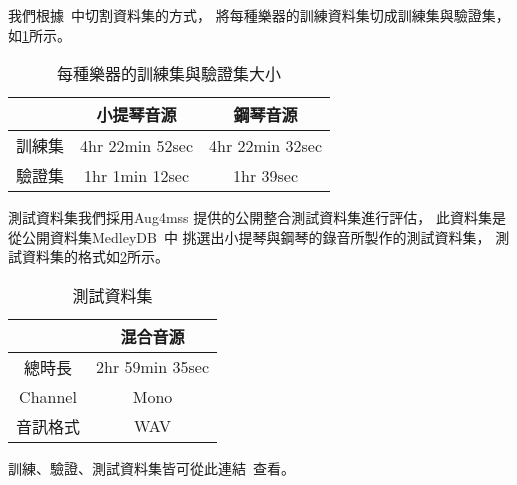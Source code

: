\documentclass[class=NCU_thesis, crop=false]{standalone}
\begin{document}
我們根據~\cite{Chiu_ChingYu2020MixingSpecific}中切割資料集的方式，
將每種樂器的訓練資料集切成訓練集與驗證集，如\cref{table:table-ours-splited-dataset}所示。
\begin{table}[h]
    \centering
    \caption{每種樂器的訓練集與驗證集大小}
    \label{table:table-ours-splited-dataset}
    \begin{tabular}{|c|c|c|}
        \hline
        \multicolumn{1}{|c|}{} & \multicolumn{1}{|c|}{小提琴音源} & \multicolumn{1}{|c|}{鋼琴音源} \\
        \hline
        訓練集 & 4hr 22min 52sec & 4hr 22min 32sec \\
        \hline
        驗證集 & 1hr 1min 12sec & 1hr 39sec \\
        \hline
    \end{tabular}
\end{table}

測試資料集我們採用Aug4mss
提供的公開整合測試資料集進行評估，
此資料集是從公開資料集MedleyDB~\cite{Bittner2014MedleyDB}中
挑選出小提琴與鋼琴的錄音所製作的測試資料集，
測試資料集的格式如\cref{table:table-test-dataset}所示。
\begin{table}[H]
    \centering
    \caption{測試資料集}
    \label{table:table-test-dataset}
    \begin{tabular}{|c|c|}
        \hline
        \multicolumn{1}{|c|}{} & \multicolumn{1}{|c|}{混合音源} \\
        \hline
        總時長 & 2hr 59min 35sec \\
        \hline
        Channel & Mono \\
        \hline
        音訊格式 & WAV \\
        \hline
    \end{tabular}
\end{table}

訓練、驗證、測試資料集皆可從此連結~\cite{YuJieLin2024MSSDataset}查看。

\end{document}
